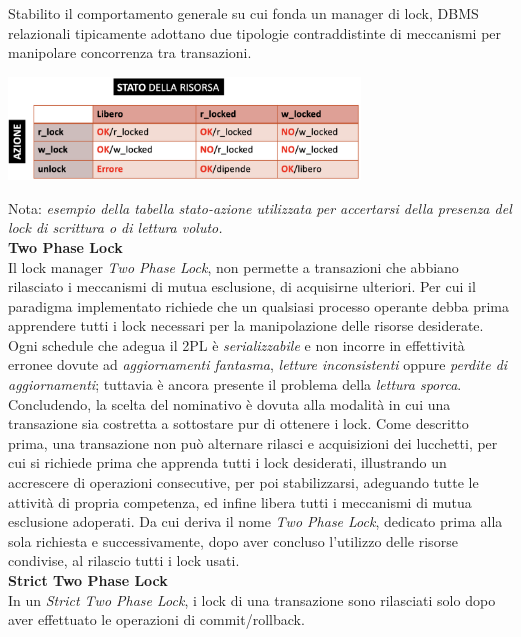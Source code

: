\documentclass{article}
\begin{document}
Stabilito il comportamento generale su cui fonda un manager di lock, DBMS relazionali tipicamente adottano due tipologie contraddistinte di meccanismi per manipolare concorrenza tra transazioni.
\begin{center}
    \includegraphics*[width=0.7\textwidth]{foto 6.png}
\end{center}\vspace*{7pt}
Nota: \textit{esempio della tabella stato-azione utilizzata per accertarsi della presenza del lock di scrittura o di lettura voluto.}\vspace*{14pt}\\
\textbf{Two Phase Lock}\\
Il lock manager \textit{Two Phase Lock}, non permette a transazioni che abbiano rilasciato i meccanismi di mutua esclusione, di acquisirne ulteriori. Per cui il paradigma implementato richiede che un qualsiasi processo operante debba prima apprendere tutti i lock necessari per la manipolazione delle risorse desiderate. Ogni schedule che adegua il 2PL è \textit{serializzabile} e non incorre in effettività erronee dovute ad \textit{aggiornamenti fantasma}, \textit{letture inconsistenti} oppure \textit{perdite di aggiornamenti}; tuttavia è ancora presente il problema della \textit{lettura sporca}.\vspace*{14pt}\\
Concludendo, la scelta del nominativo è dovuta alla modalità in cui una transazione sia costretta a sottostare pur di ottenere i lock. Come descritto prima, una transazione non può alternare rilasci e acquisizioni dei lucchetti, per cui si richiede prima che apprenda tutti i lock desiderati, illustrando un accrescere di operazioni consecutive, per poi stabilizzarsi, adeguando tutte le attività di propria competenza, ed infine libera tutti i meccanismi di mutua esclusione adoperati. Da cui deriva il nome \textit{Two Phase Lock}, dedicato prima alla sola richiesta e successivamente, dopo aver concluso l'utilizzo delle risorse condivise, al rilascio tutti i lock usati.\vspace*{14pt}\\
\textbf{Strict Two Phase Lock}\\
In un \textit{Strict Two Phase Lock}, i lock di una transazione sono rilasciati solo dopo aver effettuato le operazioni di commit/rollback.
\end{document}
